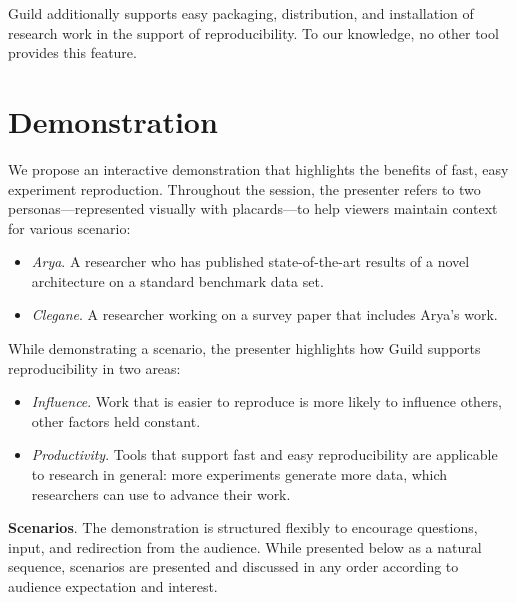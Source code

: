 \documentclass{article}
\begin{document}
Guild additionally supports easy packaging, distribution, and
installation of research work in the support of reproducibility. To
our knowledge, no other tool provides this feature.

\section{Demonstration}

We propose an interactive demonstration that highlights the benefits
of fast, easy experiment reproduction. Throughout the session, the
presenter refers to two personas---represented visually with
placards---to help viewers maintain context for various scenario:

\begin{itemize}[topsep=0pt, itemsep=0pt]
\item \emph{Arya}. A researcher who has published state-of-the-art
  results of a novel architecture on a standard benchmark data set.
\item \emph{Clegane}. A researcher working on a survey paper that
  includes Arya's work.
\end{itemize}

While demonstrating a scenario, the presenter highlights how Guild
supports reproducibility in two areas:

\begin{itemize}[topsep=0pt, itemsep=0pt]
\item \emph{Influence}. Work that is easier to reproduce is more
  likely to influence others, other factors held constant.

\item \emph{Productivity}. Tools that support fast and easy
  reproducibility are applicable to research in general: more
  experiments generate more data, which researchers can use to advance
  their work.
\end{itemize}

\textbf{Scenarios}. The demonstration is structured flexibly to
encourage questions, input, and redirection from the audience. While
presented below as a natural sequence, scenarios are presented and
discussed in any order according to audience expectation and interest.
\end{document}
